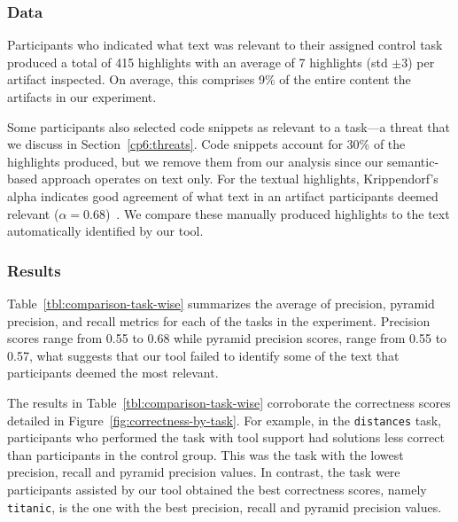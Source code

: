 \subsubsection{Data}

Participants who indicated what text was relevant to their assigned control task produced a total of 415 highlights with an average of 7 highlights (std $\pm 3$) per artifact inspected.
On average, this comprises 9\% of the entire content the artifacts in our experiment. 


Some participants also selected code snippets as relevant to a task---a threat that we discuss in Section~\ref{cp6:threats}. 
Code snippets account for 30\% of the highlights produced, but we remove them from our analysis since our semantic-based approach 
operates on text only. For the textual highlights,
Krippendorf's alpha indicates good agreement of what text in an artifact participants deemed relevant ($\alpha = 0.68$)~\cite{Krippendorff1980, passonneau2006}.
We compare these manually produced highlights to the text automatically identified by our tool.





\subsubsection{Results}



Table~\ref{tbl:comparison-task-wise} summarizes the average of precision, pyramid precision, and recall metrics for each of the tasks in the experiment.
Precision scores range from 0.55 to 0.68 while pyramid precision scores, range from 0.55 to 0.57, what suggests that our tool failed to identify some of the text that participants deemed the most relevant.



The results in Table~\ref{tbl:comparison-task-wise} corroborate 
the correctness scores detailed in Figure~\ref{fig:correctness-by-task}. For example, 
in the \texttt{distances} task, participants who performed the task with tool support had  solutions less correct than participants in the control group.
This was the task with the lowest precision, recall and pyramid precision values. 
In contrast, the task were participants assisted by our tool obtained the best correctness scores, namely \texttt{titanic}, is the one with the best precision, recall and pyramid precision values.





